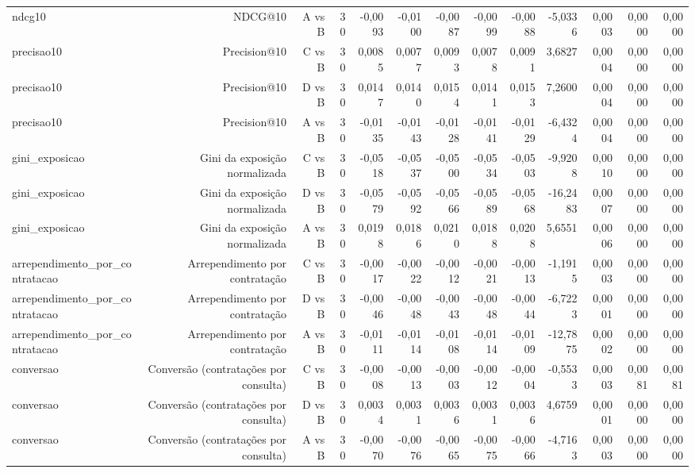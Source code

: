\begin{table}[ht]
\begin{tabular}{lrrrrrrrrrrrr}
ndcg10 & NDCG@10 & A vs B & 30 & -0,0093 & -0,0100 & -0,0087 & -0,0099 & -0,0088 & -5,0336 & 0,0003 & 0,0000 & 0,0000 \\
precisao10 & Precision@10 & C vs B & 30 & 0,0085 & 0,0077 & 0,0093 & 0,0078 & 0,0091 & 3,6827 & 0,0004 & 0,0000 & 0,0000 \\
precisao10 & Precision@10 & D vs B & 30 & 0,0147 & 0,0140 & 0,0154 & 0,0141 & 0,0153 & 7,2600 & 0,0004 & 0,0000 & 0,0000 \\
precisao10 & Precision@10 & A vs B & 30 & -0,0135 & -0,0143 & -0,0128 & -0,0141 & -0,0129 & -6,4324 & 0,0004 & 0,0000 & 0,0000 \\
gini\_exposicao & Gini da exposição normalizada & C vs B & 30 & -0,0518 & -0,0537 & -0,0500 & -0,0534 & -0,0503 & -9,9208 & 0,0010 & 0,0000 & 0,0000 \\
gini\_exposicao & Gini da exposição normalizada & D vs B & 30 & -0,0579 & -0,0592 & -0,0566 & -0,0589 & -0,0568 & -16,2483 & 0,0007 & 0,0000 & 0,0000 \\
gini\_exposicao & Gini da exposição normalizada & A vs B & 30 & 0,0198 & 0,0186 & 0,0210 & 0,0188 & 0,0208 & 5,6551 & 0,0006 & 0,0000 & 0,0000 \\
arrependimento\_por\_contratacao & Arrependimento por contratação & C vs B & 30 & -0,0017 & -0,0022 & -0,0012 & -0,0021 & -0,0013 & -1,1915 & 0,0003 & 0,0000 & 0,0000 \\
arrependimento\_por\_contratacao & Arrependimento por contratação & D vs B & 30 & -0,0046 & -0,0048 & -0,0043 & -0,0048 & -0,0044 & -6,7223 & 0,0001 & 0,0000 & 0,0000 \\
arrependimento\_por\_contratacao & Arrependimento por contratação & A vs B & 30 & -0,0111 & -0,0114 & -0,0108 & -0,0114 & -0,0109 & -12,7875 & 0,0002 & 0,0000 & 0,0000 \\
conversao & Conversão (contratações por consulta) & C vs B & 30 & -0,0008 & -0,0013 & -0,0003 & -0,0012 & -0,0004 & -0,5533 & 0,0003 & 0,0081 & 0,0081 \\
conversao & Conversão (contratações por consulta) & D vs B & 30 & 0,0034 & 0,0031 & 0,0036 & 0,0031 & 0,0036 & 4,6759 & 0,0001 & 0,0000 & 0,0000 \\
conversao & Conversão (contratações por consulta) & A vs B & 30 & -0,0070 & -0,0076 & -0,0065 & -0,0075 & -0,0066 & -4,7163 & 0,0003 & 0,0000 & 0,0000 \\
\hline
\end{tabular}
\end{table}
